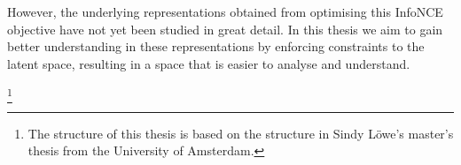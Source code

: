 However, the underlying representations obtained from optimising this InfoNCE objective have not yet been studied in great detail. In this thesis we aim to gain better understanding in these representations by enforcing constraints to the latent space, resulting in a space that is easier to analyse and understand.

\footnote{The structure of this thesis is based on the structure in Sindy Löwe's master's thesis from the University of Amsterdam.}
























%
